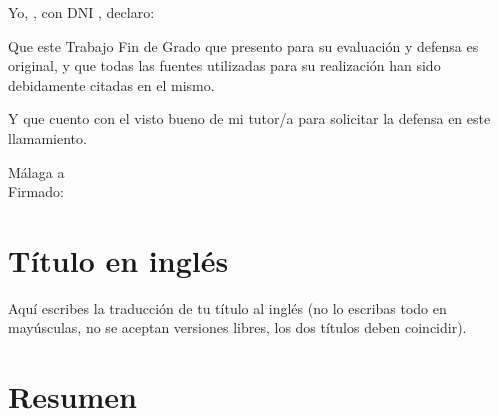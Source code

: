 \documentclass[13pt,a4paper]{report}
\begin{document}


Yo, \makebox[2cm]{\dotfill}, con DNI  \makebox[2cm]{\dotfill}, declaro:  %


Que este Trabajo Fin de Grado que presento para su evaluación y defensa es original, y que todas las fuentes utilizadas para su realización han sido debidamente citadas en el mismo. 


Y que cuento con el visto bueno de mi tutor/a para solicitar la defensa en este llamamiento.
\begin{flushright}
    Málaga a  \makebox[2cm]{\dotfill} \\ %
    \vspace{5cm}
     Firmado: \makebox[5cm]{\dotfill} %
\end{flushright}



\newpage
{} %

\renewcommand{\contentsname}{ÍNDICE} 
\clearpage
\tableofcontents

\newpage 

\pagestyle{fancy}
\fancyhf{}
\fancyfoot[C]{\fontsize{13pt}{15pt}\selectfont\thepage} %


\section{Título en inglés}


Aquí escribes la traducción de tu título al inglés (no lo escribas todo en mayúsculas, no se aceptan versiones libres, los dos títulos deben coincidir).


\section{Resumen}
\end{document}
